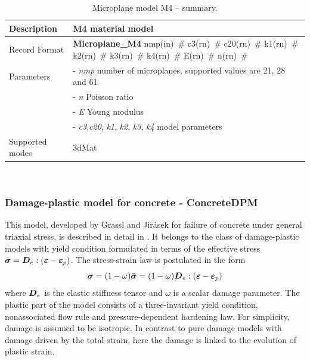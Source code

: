 \documentclass[a4paper]{article}
\newcommand{\mbf}[1]{\mbox{\boldmath$#1$}}
\newcommand{\descitem}[1]{{\noindent \bf #1}}
\newcommand{\elemparam}[2]{{{#1\tiny (#2)}~\#}}
\newcommand{\param}[1]{{\it #1}}
\newcommand{\veps}{\mbf{\varepsilon}}  %
\newcommand{\vsig}{\mbf{\sigma}}%
\newenvironment{mmt}{\begin{tabular}{|l|p{9cm}|}}{\end{tabular}\\}
\newenvironment{mmt}{\begin{tabular}{|l|l|}}{\end{tabular}\\}
\begin{document}
\begin{table}[!htb]
\begin{mmt}
\hline
Description & M4 material model\\
\hline
Record Format & \descitem{Microplane\_M4}  \elemparam{nmp}{in}
\elemparam{c3}{rn} \elemparam{c20}{rn} \elemparam{k1}{rn}
\elemparam{k2}{rn} \elemparam{k3}{rn} \elemparam{k4}{rn}
\elemparam{E}{rn} \elemparam{n}{rn} \\
Parameters &- \param{nmp} number of microplanes, supported values are
21, 28 and 61\\
&- \param{n} Poisson ratio\\
&- \param{E} Young modulus \\
&- \param{c3},\param{c20}, \param{k1}, \param{k2}, \param{k3},
\param{k4}  model parameters\\
Supported modes& 3dMat\\
\hline
\end{mmt}
\caption{Microplane model M4 -- summary.}
\label{m4_table}
\end{table}

\newcommand{\beq}{\begin{equation}}
\newcommand{\eeq}{\end{equation}}
\newcommand{\fc}{\bar{f}_c}
\newcommand{\ft}{\bar{f}_t}
\newcommand{\mD}{\mbf{D}}
\newcommand{\qh}{q_{\rm h}}

\subsubsection{Damage-plastic model for concrete - ConcreteDPM} \label{sec:cdpm}

This model, developed by Grassl and Jir\'{a}sek for failure of concrete
under general triaxial stress, is described in detail in \cite{GraJir}.
It belongs to the class of damage-plastic models with yield condition formulated
in terms of the effective stress $\bar{\vsig}=\mD_e:(\veps-\veps_p)$.
The stress-strain law is postulated in the form 
\beq\label{cdpm1-1}
\vsig = (1-\omega)\bar{\vsig}=(1-\omega)\mD_e:(\veps-\veps_p)
\eeq
where $\mD_e$ is the elastic stiffness tensor
and $\omega$ is a scalar damage parameter. 
The plastic part of the model consists of a three-invariant yield condition, nonassociated flow rule and pressure-dependent hardening law. 
For simplicity, damage is assumed to be isotropic.
In contrast to pure damage models with damage driven by the total strain, here the damage is linked to the evolution of plastic strain.
\end{document}
